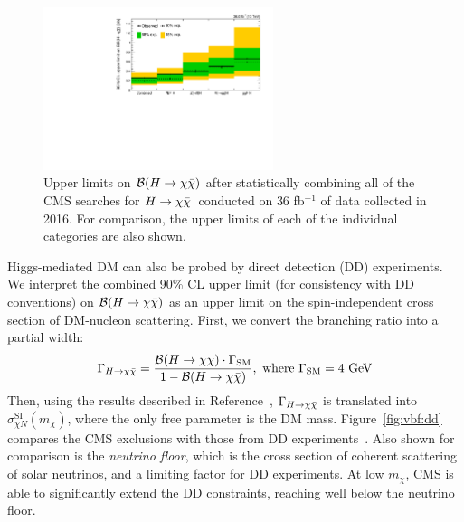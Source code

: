 \begin{figure}[]
    \begin{center}
        \includegraphics[width=0.6\textwidth]{figures/vbf/fits/comb.pdf}
        \caption{Upper limits on $\mathcal{B}(H\rightarrow\chi\bar\chi)$ after statistically combining all of the CMS searches for $H\rightarrow\chi\bar\chi$~conducted on $36$ fb$^{-1}$ of data collected in 2016.
                 For comparison, the upper limits of each of the individual categories are also shown.}
        \label{fig:vbf:comb}
    \end{center}
\end{figure}

Higgs-mediated DM can also be probed by direct detection (DD) experiments.
We interpret the combined 90\% CL upper limit (for consistency with DD conventions) on $\mathcal{B}(H\rightarrow\chi\bar\chi)$ as an upper limit on the spin-independent cross section of DM-nucleon scattering. 
First, we convert the branching ratio into a partial width:
\begin{equation}
    \Gamma_{H\rightarrow\chi\bar\chi} = \frac{\mathcal{B}(H\rightarrow\chi\bar\chi) \cdot \Gamma_\mathrm{SM}}{1 - \mathcal{B}(H\rightarrow\chi\bar\chi)}, \text{ where }\Gamma_\mathrm{SM} = 4~\mathrm{GeV}
\end{equation}
Then, using the results described in Reference~\cite{higgsdm3}, $\Gamma_{H\rightarrow\chi\bar\chi}$ is translated into $\sigma^{\mathrm{SI}}_{\chi N}(m_\chi)$, where the only free parameter is the DM mass.
Figure~\ref{fig:vbf:dd} compares the CMS exclusions with those from DD experiments~\needcite.
Also shown for comparison is the \emph{neutrino floor}, which is the cross section of coherent scattering of solar neutrinos, and a limiting factor for DD experiments.
At low $m_\chi$, CMS is able to significantly extend the DD constraints, reaching well below the neutrino floor. 

